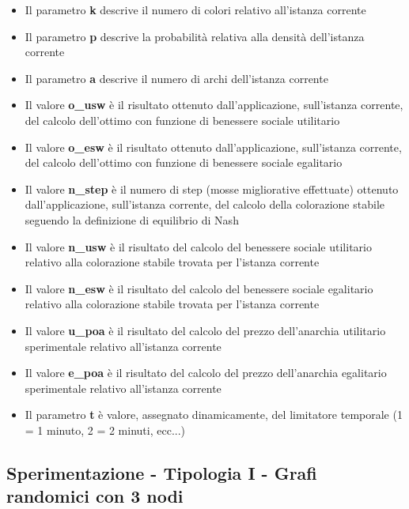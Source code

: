 \begin{itemize}
	\item Il parametro \textbf{k} descrive il numero di colori relativo all'istanza corrente
	\item Il parametro \textbf{p} descrive la probabilità relativa alla densità dell'istanza corrente
	\item Il parametro \textbf{a} descrive il numero di archi dell'istanza corrente
	\item Il valore \textbf{o\_usw} è il risultato ottenuto dall'applicazione, sull'istanza corrente, del calcolo dell'ottimo con funzione di benessere sociale utilitario
	\item Il valore \textbf{o\_esw} è il risultato ottenuto dall'applicazione, sull'istanza corrente, del calcolo dell'ottimo con funzione di benessere sociale egalitario
	\item Il valore \textbf{n\_step} è il numero di step (mosse migliorative effettuate) ottenuto dall'applicazione, sull'istanza corrente, del calcolo della colorazione stabile seguendo la definizione di equilibrio di Nash
	\item Il valore \textbf{n\_usw} è il risultato del calcolo del benessere sociale utilitario relativo alla colorazione stabile trovata per l'istanza corrente
	\item Il valore \textbf{n\_esw} è il risultato del calcolo del benessere sociale egalitario relativo alla colorazione stabile trovata per l'istanza corrente
	\item Il valore \textbf{u\_poa} è il risultato del calcolo del prezzo dell'anarchia utilitario sperimentale relativo all'istanza corrente
	\item Il valore \textbf{e\_poa} è il risultato del calcolo del prezzo dell'anarchia egalitario sperimentale relativo all'istanza corrente
	\item Il parametro \textbf{t} è valore, assegnato dinamicamente, del limitatore temporale (1 = 1 minuto, 2 = 2 minuti, ecc...) 
\end{itemize}


\subsection{Sperimentazione - Tipologia I - Grafi randomici con 3 nodi}

